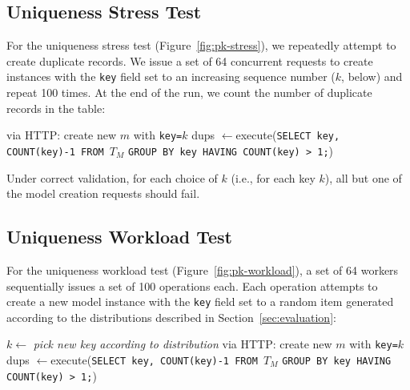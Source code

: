 \subsection{Uniqueness Stress Test}
\label{sec:appendix-uniqueness-stress}

For the uniqueness stress test (Figure~\ref{fig:pk-stress}), we repeatedly attempt to create duplicate records. We issue a set of 64 concurrent requests to create instances with the \texttt{key} field set to an increasing sequence number ($k$, below) and repeat 100 times. At the end of the run, we count the number of duplicate records in the table:\vspace{-1em}
\begin{algorithm}[H]
\begin{algorithmic}
      \State via HTTP: create new $m$ with \texttt{key=$k$}
     \EndParFor
   \EndFor
   \State dups $\gets $execute(\texttt{SELECT key, COUNT(key)-1 FROM $T_M$}
   \State \hspace{6.5em}\texttt{GROUP BY key HAVING COUNT(key) > 1;})
\EndFor
\end{algorithmic}
\end{algorithm}\vspace{-1em}
Under correct validation, for each choice of $k$ (i.e., for each key $k$), all but one of the model creation requests should fail.

\subsection{Uniqueness Workload Test}
\label{sec:appendix-uniqueness-workload}

For the uniqueness workload test (Figure~\ref{fig:pk-workload}), a set of 64 workers sequentially issues a set of 100 operations each. Each operation attempts to create a new model instance with the \texttt{key} field set to a random item generated according to the distributions described in Section~\ref{sec:evaluation}:\vspace{-1em}
\begin{algorithm}[H]
\begin{algorithmic}
      \State $k \gets$ \textit{pick new key according to distribution}
      \State via HTTP: create new $m$ with \texttt{key=$k$}
     \EndFor
   \EndParFor
   \State dups $\gets $execute(\texttt{SELECT key, COUNT(key)-1 FROM $T_M$}
   \State \hspace{6.5em}\texttt{GROUP BY key HAVING COUNT(key) > 1;})
\EndFor
\end{algorithmic}
\end{algorithm}

